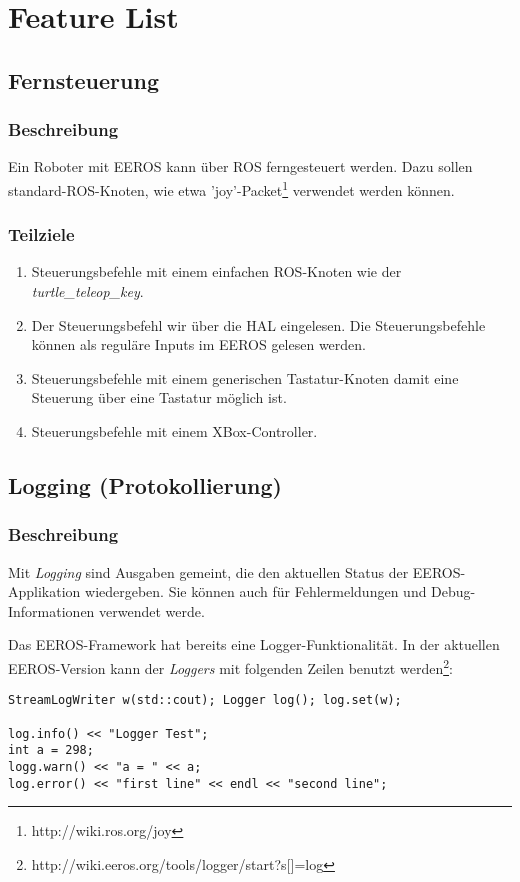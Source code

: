 \chapter{Feature List}


\section{Fernsteuerung}
\subsection{Beschreibung}
Ein Roboter mit EEROS kann über ROS ferngesteuert werden.
Dazu sollen standard-ROS-Knoten, wie etwa 'joy'-Packet\footnote{http://wiki.ros.org/joy} verwendet werden können.

\subsection{Teilziele}
\begin{enumerate}
\item Steuerungsbefehle mit einem einfachen ROS-Knoten wie der \textit{turtle\_teleop\_key}.
\item Der Steuerungsbefehl wir über die HAL eingelesen. Die Steuerungsbefehle können als reguläre Inputs im EEROS gelesen werden.
\item Steuerungsbefehle mit einem generischen Tastatur-Knoten damit eine Steuerung über eine Tastatur möglich ist.
\item Steuerungsbefehle mit einem XBox-Controller.
\end{enumerate}


\section{Logging (Protokollierung)}
\subsection{Beschreibung}
Mit \textit{Logging} sind Ausgaben gemeint, die den aktuellen Status der EEROS-Applikation wiedergeben.
Sie können auch für Fehlermeldungen und Debug-Informationen verwendet werde.

Das EEROS-Framework hat bereits eine Logger-Funktionalität.
In der aktuellen EEROS-Version kann der \textit{Loggers}  mit folgenden Zeilen benutzt werden\footnote{http://wiki.eeros.org/tools/logger/start?s[]=log}:
\lstset{language=C++}
\begin{lstlisting}
StreamLogWriter w(std::cout); Logger log(); log.set(w);

log.info() << "Logger Test";
int a = 298;
logg.warn() << "a = " << a;
log.error() << "first line" << endl << "second line"; 
\end{lstlisting}

